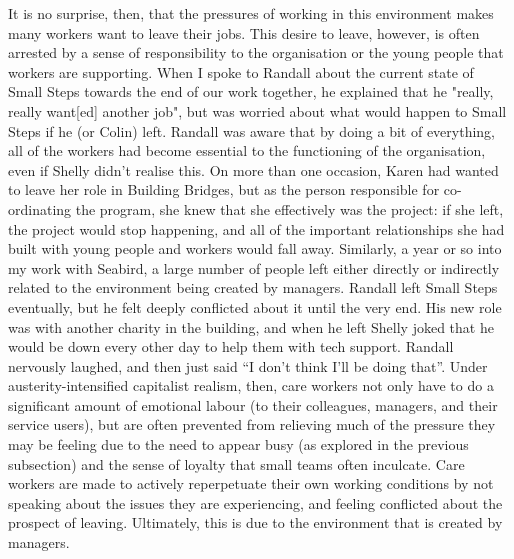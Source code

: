 It is no surprise, then, that the pressures of working in this environment makes many workers want to leave their jobs. This desire to leave, however, is often arrested by a sense of responsibility to the organisation or the young people that workers are supporting. When I spoke to Randall about the current state of Small Steps towards the end of our work together, he explained that he "really, really want[ed] another job", but was worried about what would happen to Small Steps if he (or Colin) left. Randall was aware that by doing a bit of everything, all of the workers had become essential to the functioning of the organisation, even if Shelly didn't realise this. On more than one occasion, Karen had wanted to leave her role in Building Bridges, but as the person responsible for co-ordinating the program, she knew that she effectively was the project: if she left, the project would stop happening, and all of the important relationships she had built with young people and workers would fall away. Similarly, a year or so into my work with Seabird, a large number of people left either directly or indirectly related to the environment being created by managers. Randall left Small Steps eventually, but he felt deeply conflicted about it until the very end. His new role was with another charity in the building, and when he left Shelly joked that he would be down every other day to help them with tech support. Randall nervously laughed, and then just said “I don’t think I’ll be doing that”. Under austerity-intensified capitalist realism, then, care workers not only have to do a significant amount of emotional labour (to their colleagues, managers, and their service users), but are often prevented from relieving much of the pressure they may be feeling due to the need to appear busy (as explored in the previous subsection) and the sense of loyalty that small teams often inculcate. Care workers are made to actively reperpetuate their own working conditions by not speaking about the issues they are experiencing, and feeling conflicted about the prospect of leaving. Ultimately, this is due to the environment that is created by managers.

